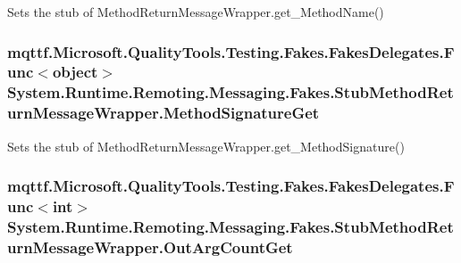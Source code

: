 Sets the stub of Method\-Return\-Message\-Wrapper.\-get\-\_\-\-Method\-Name()

\hypertarget{class_system_1_1_runtime_1_1_remoting_1_1_messaging_1_1_fakes_1_1_stub_method_return_message_wrapper_a498dbbbcc7a9be0f18136d79dc1e66f9}{
\subsubsection[{Method\-Signature\-Get}]{\setlength{\rightskip}{0pt plus 5cm}mqttf.\-Microsoft.\-Quality\-Tools.\-Testing.\-Fakes.\-Fakes\-Delegates.\-Func$<$object$>$ System.\-Runtime.\-Remoting.\-Messaging.\-Fakes.\-Stub\-Method\-Return\-Message\-Wrapper.\-Method\-Signature\-Get}}\label{class_system_1_1_runtime_1_1_remoting_1_1_messaging_1_1_fakes_1_1_stub_method_return_message_wrapper_a498dbbbcc7a9be0f18136d79dc1e66f9}


Sets the stub of Method\-Return\-Message\-Wrapper.\-get\-\_\-\-Method\-Signature()

\hypertarget{class_system_1_1_runtime_1_1_remoting_1_1_messaging_1_1_fakes_1_1_stub_method_return_message_wrapper_a0bb158bbb90fa162668f9def1186c846}{
\subsubsection[{Out\-Arg\-Count\-Get}]{\setlength{\rightskip}{0pt plus 5cm}mqttf.\-Microsoft.\-Quality\-Tools.\-Testing.\-Fakes.\-Fakes\-Delegates.\-Func$<$int$>$ System.\-Runtime.\-Remoting.\-Messaging.\-Fakes.\-Stub\-Method\-Return\-Message\-Wrapper.\-Out\-Arg\-Count\-Get}}\label{class_system_1_1_runtime_1_1_remoting_1_1_messaging_1_1_fakes_1_1_stub_method_return_message_wrapper_a0bb158bbb90fa162668f9def1186c846}


